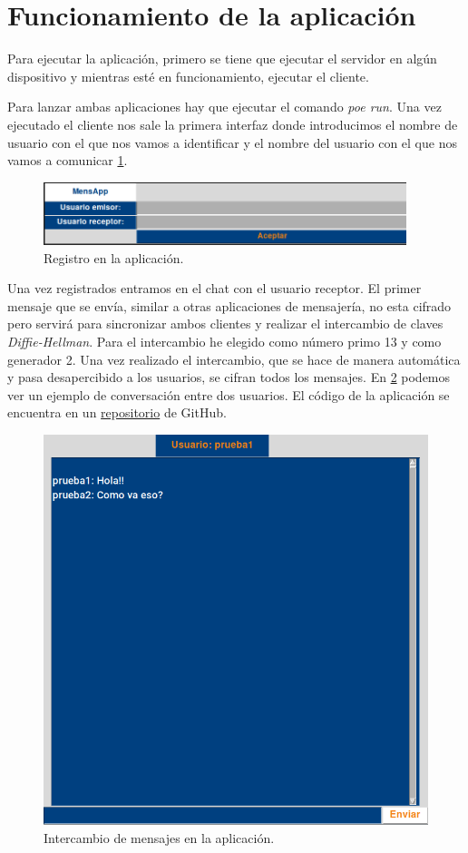 \section{Funcionamiento de la aplicación}
Para ejecutar la aplicación, primero se tiene que ejecutar el servidor en algún dispositivo y mientras esté en funcionamiento, ejecutar el cliente.

Para lanzar ambas aplicaciones hay que ejecutar el comando \emph{poe run}. Una vez ejecutado el cliente nos sale la primera interfaz donde introducimos el nombre de usuario con el que nos vamos a identificar y el nombre del usuario con el que nos vamos a comunicar \ref{appprimeraparte}.

\begin{figure}[thb]
	\centering
	\includegraphics[width=400]{imagenes/mensapp1.png} 
	\caption{Registro en la aplicación.}
	\label{appprimeraparte}
\end{figure}
\newpage
Una vez registrados entramos en el chat con el usuario receptor. El primer mensaje que se envía, similar a otras aplicaciones de mensajería, no esta cifrado pero servirá para sincronizar ambos clientes y realizar el intercambio de claves \emph{Diffie-Hellman}. Para el intercambio he elegido como número primo 13 y como generador 2.  Una vez realizado el intercambio, que se hace de manera automática y pasa desapercibido a los usuarios, se cifran todos los mensajes. En \ref{appsegundaparte} podemos ver un ejemplo de conversación entre dos usuarios. El código de la aplicación se encuentra en un \href{https://github.com/luistf24/MensApp-TFG}{repositorio} de GitHub.
\begin{figure}[hbt]
	\centering
	\includegraphics[scale=0.45]{imagenes/mensapp2.png} 
	\caption{Intercambio de mensajes en la aplicación.}
	\label{appsegundaparte}
\end{figure}

